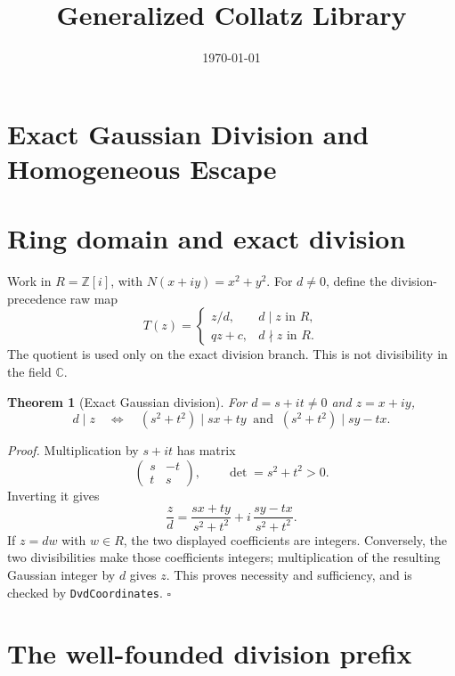 \documentclass[11pt,letterpaper]{article}
\title{Generalized Collatz Library}
\author{}
\date{\today}
\newcommand{\Z}{\mathbb{Z}}
\newcommand{\C}{\mathbb{C}}
\newtheorem{theorem}{Theorem}
\newenvironment{proof}{\noindent\textit{Proof.}}{\hfill\(\square\)}
\begin{document}
\maketitle
\section*{Exact Gaussian Division and Homogeneous Escape}

\section{Ring domain and exact division}

Work in \(R=\Z[i]\), with \(N(x+iy)=x^2+y^2\). For \(d\ne0\), define the division-precedence raw map
\[
T(z)=
\begin{cases}
z/d,&d\mid z\text{ in }R,\\
qz+c,&d\nmid z\text{ in }R.
\end{cases}
\]
The quotient is used only on the exact division branch. This is not divisibility in the field \(\C\).

\begin{theorem}[Exact Gaussian division]
For \(d=s+it\ne0\) and \(z=x+iy\),
\[
d\mid z\quad\Longleftrightarrow\quad
(s^2+t^2)\mid sx+ty\ \text{ and }\ (s^2+t^2)\mid sy-tx.
\]
\end{theorem}
\begin{proof}
Multiplication by \(s+it\) has matrix
\[
\begin{pmatrix}s&-t\\t&s\end{pmatrix},
\qquad \det=s^2+t^2>0.
\]
Inverting it gives
\[
\frac{z}{d}=\frac{sx+ty}{s^2+t^2}
+i\,\frac{sy-tx}{s^2+t^2}.
\]
If \(z=dw\) with \(w\in R\), the two displayed coefficients are integers. Conversely, the two divisibilities make those coefficients integers; multiplication of the resulting Gaussian integer by \(d\) gives \(z\). This proves necessity and sufficiency, and is checked by \texttt{DvdCoordinates}.
\end{proof}

\section{The well-founded division prefix}
\end{document}
